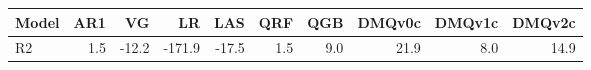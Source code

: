 \begin{tabular}{lrrrrrrrrr}
\toprule
Model & AR1 & VG & LR & LAS & QRF & QGB & DMQv0c & DMQv1c & DMQv2c \\
\midrule
R2 & 1.5 & -12.2 & -171.9 & -17.5 & 1.5 & 9.0 & 21.9 & 8.0 & 14.9 \\
\bottomrule
\end{tabular}
